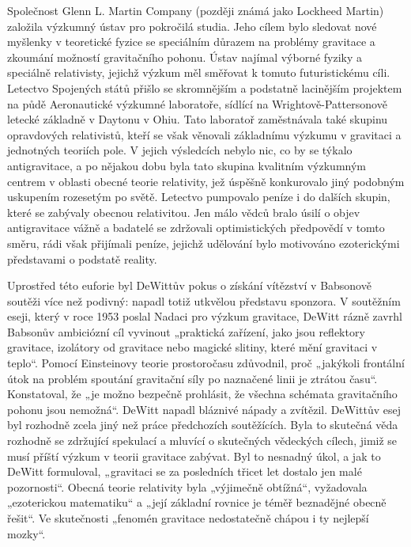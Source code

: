   Společnost Glenn L. Martin Company (později známá jako Lockheed Martin) založila výzkumný ústav
  pro pokročilá studia. Jeho cílem bylo sledovat nové myšlenky v teoretické fyzice se speciálním
  důrazem na problémy gravitace a zkoumání možností gravitačního pohonu. Ústav najímal výborné
  fyziky a speciálně relativisty, jejichž výzkum měl směřovat k tomuto futuristickému cíli. Letectvo
  Spojených států přišlo se skromnějším a podstatně lacinějším projektem na půdě Aeronautické
  výzkumné laboratoře, sídlící na Wrightově-Pattersonově letecké základně v Daytonu v Ohiu. Tato
  laboratoř zaměstnávala také skupinu opravdových relativistů, kteří se však věnovali základnímu
  výzkumu v gravitaci a jednotných teoriích pole. V jejich výsledcích nebylo nic, co by se týkalo
  antigravitace, a po nějakou dobu byla tato skupina kvalitním výzkumným centrem v oblasti obecné
  teorie relativity, jež úspěšně konkurovalo jiný podobným uskupením rozesetým po světě. Letectvo
  pumpovalo peníze i do dalších skupin, které se zabývaly obecnou relativitou. Jen málo vědců bralo
  úsilí o objev antigravitace vážně a badatelé se zdržovali optimistických předpovědí v tomto směru,
  rádi však přijímali peníze, jejichž udělování bylo motivováno ezoterickými představami o podstatě
  reality. 

  Uprostřed této euforie byl DeWittův pokus o získání vítězství v Babsonově soutěži více než
  podivný: napadl totiž utkvělou představu sponzora. V soutěžním eseji, který v roce 1953 poslal
  Nadaci pro výzkum gravitace, DeWitt rázně zavrhl Babsonův ambiciózní cíl vyvinout „praktická
  zařízení, jako jsou reflektory gravitace, izolátory od gravitace nebo magické slitiny, které mění
  gravitaci v teplo“. Pomocí Einsteinovy teorie prostoročasu zdůvodnil, proč „jakýkoli frontální
  útok na problém spoutání gravitační síly po naznačené linii je ztrátou času“. Konstatoval, že „je
  možno bezpečně prohlásit, že všechna schémata gravitačního pohonu jsou nemožná“. DeWitt napadl
  bláznivé nápady a zvítězil. DeWittův esej byl rozhodně zcela jiný než práce předchozích
  soutěžících. Byla to skutečná věda rozhodně se zdržující spekulací a mluvící o skutečných
  vědeckých cílech, jimiž se musí příští výzkum v teorii gravitace zabývat. Byl to nesnadný úkol, a
  jak to DeWitt formuloval, „gravitaci se za posledních třicet let dostalo jen malé pozornosti“.
  Obecná teorie relativity byla „výjimečně obtížná“, vyžadovala „ezoterickou matematiku“ a „její
  základní rovnice je téměř beznadějné obecně řešit“. Ve skutečnosti „fenomén gravitace nedostatečně
  chápou i ty nejlepší mozky“. 

